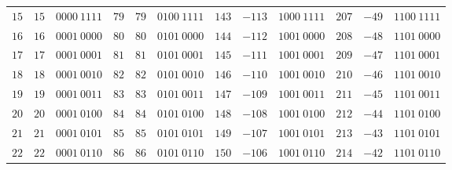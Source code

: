 \begin{center}
\begin{minipage}{0.5\linewidth}
\begin{center}
\begin{tabular}{|c|c|c||c|c|c||c|c|c||c|c|c|}
            \textcolor{numColor}{$15$} & \textcolor{twoColor}{$15$} & $0000~1111$ & \textcolor{numColor}{$79$} & \textcolor{twoColor}{$79$} & $0100~1111$ & \textcolor{numColor}{$143$} & \textcolor{twoColor}{$-113$} & $1000~1111$ & \textcolor{numColor}{$207$} & \textcolor{twoColor}{$-49$} & $1100~1111$\\ 
            \textcolor{numColor}{$16$} & \textcolor{twoColor}{$16$} & $0001~0000$ & \textcolor{numColor}{$80$} & \textcolor{twoColor}{$80$} & $0101~0000$ & \textcolor{numColor}{$144$} & \textcolor{twoColor}{$-112$} & $1001~0000$ & \textcolor{numColor}{$208$} & \textcolor{twoColor}{$-48$} & $1101~0000$\\ 
            \textcolor{numColor}{$17$} & \textcolor{twoColor}{$17$} & $0001~0001$ & \textcolor{numColor}{$81$} & \textcolor{twoColor}{$81$} & $0101~0001$ & \textcolor{numColor}{$145$} & \textcolor{twoColor}{$-111$} & $1001~0001$ & \textcolor{numColor}{$209$} & \textcolor{twoColor}{$-47$} & $1101~0001$\\ 
            \textcolor{numColor}{$18$} & \textcolor{twoColor}{$18$} & $0001~0010$ & \textcolor{numColor}{$82$} & \textcolor{twoColor}{$82$} & $0101~0010$ & \textcolor{numColor}{$146$} & \textcolor{twoColor}{$-110$} & $1001~0010$ & \textcolor{numColor}{$210$} & \textcolor{twoColor}{$-46$} & $1101~0010$\\ 
            \textcolor{numColor}{$19$} & \textcolor{twoColor}{$19$} & $0001~0011$ & \textcolor{numColor}{$83$} & \textcolor{twoColor}{$83$} & $0101~0011$ & \textcolor{numColor}{$147$} & \textcolor{twoColor}{$-109$} & $1001~0011$ & \textcolor{numColor}{$211$} & \textcolor{twoColor}{$-45$} & $1101~0011$\\ 
            \textcolor{numColor}{$20$} & \textcolor{twoColor}{$20$} & $0001~0100$ & \textcolor{numColor}{$84$} & \textcolor{twoColor}{$84$} & $0101~0100$ & \textcolor{numColor}{$148$} & \textcolor{twoColor}{$-108$} & $1001~0100$ & \textcolor{numColor}{$212$} & \textcolor{twoColor}{$-44$} & $1101~0100$\\ 
            \textcolor{numColor}{$21$} & \textcolor{twoColor}{$21$} & $0001~0101$ & \textcolor{numColor}{$85$} & \textcolor{twoColor}{$85$} & $0101~0101$ & \textcolor{numColor}{$149$} & \textcolor{twoColor}{$-107$} & $1001~0101$ & \textcolor{numColor}{$213$} & \textcolor{twoColor}{$-43$} & $1101~0101$\\ 
            \textcolor{numColor}{$22$} & \textcolor{twoColor}{$22$} & $0001~0110$ & \textcolor{numColor}{$86$} & \textcolor{twoColor}{$86$} & $0101~0110$ & \textcolor{numColor}{$150$} & \textcolor{twoColor}{$-106$} & $1001~0110$ & \textcolor{numColor}{$214$} & \textcolor{twoColor}{$-42$} & $1101~0110$\\ 

\end{tabular}
\end{center}
\end{minipage}
\end{center}
